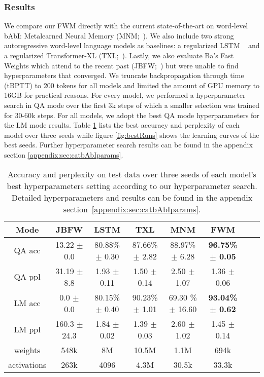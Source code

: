 \documentclass{article} \usepackage{iclr2021_conference,times}
\begin{document}
\subsubsection{Results}
We compare our FWM directly with the current state-of-the-art on word-level bAbI: Metalearned Neural Memory (MNM;~\citet{munkhdalai2019metalearned}).
We also include two strong autoregressive word-level language models as baselines: a regularized LSTM ~\citep{merity2018regularizing, lstm_still_sota_melis} and a regularized Transformer-XL (TXL;~\citet{dai2019transformer}). 
Lastly, we also evaluate Ba's Fast Weights which attend to the recent past (JBFW;~\citet{Ba2016using}) but were unable to find hyperparameters that converged.
We truncate backpropagation through time (tBPTT) to 200 tokens for all models and limited the amount of GPU memory to \texttildelow16GB for practical reasons. 
For every model, we performed a hyperparameter search in QA mode over the first 3k steps of which a smaller selection was trained for 30-60k steps. For all models, we adopt the best QA mode hyperparameters for the LM mode results.
Table \ref{tbl:catbAbI} lists the best accuracy and perplexity of each model over three seeds while figure \ref{fig:bestRuns} shows the learning curves of the best seeds.
Further hyperparameter search results can be found in the appendix section \ref{appendix:sec:catbAbIparams}.
\begin{table}[h]
  \vspace{-6pt}
  \caption{
  Accuracy and perplexity on test data over three seeds of each model's best hyperparameters setting according to our hyperparameter search. Detailed hyperparameters and results can be found in the appendix section~\ref{appendix:sec:catbAbIparams}.}
  \vspace{5pt}
  \label{tbl:catbAbI}
  \centering
  \setlength{\tabcolsep}{4pt}
  \renewcommand{\arraystretch}{1}
  \begin{tabular}{cccccccc}
    \toprule
    Mode & JBFW & LSTM & TXL & MNM & FWM \\
    \midrule
QA acc   & 13.22 $\pm$ 0.0 & 80.88\% $\pm$ 0.30  & 87.66\% $\pm$ 2.82  & 88.97\% $\pm$ 6.28   & \textbf{96.75\% $\pm$ 0.05} \\
    QA ppl   & 31.19 $\pm$ 8.8 & 1.93 $\pm$ 0.11     & 1.50 $\pm$ 0.14     & 2.50 $\pm$ 1.07      & 1.36 $\pm$ 0.06 \\
LM acc \rule{0pt}{1.2\normalbaselineskip}
             & 0.0 $\pm$ 0.0  & 80.15\% $\pm$ 0.40   & 90.23\% $\pm$ 1.01  & 69.30 \% $\pm$ 16.60 & \textbf{93.04\% $\pm$ 0.62} \\
    LM ppl   & 160.3 $\pm$ 24.3& 1.84 $\pm$ 0.02     & 1.39 $\pm$ 0.03     & 2.60 $\pm$ 1.02      & 1.45 $\pm$ 0.14 \\
weights \rule{0pt}{1.2\normalbaselineskip}
                & 548k\footnotemark & 8M     & 10.5M & 1.1M  & 694k \\
    activations & 263k   & 4096   & 4.3M\footnotemark & 30.5k & 33.3k \\
    \bottomrule
  \end{tabular}
\end{table}
\end{document}

